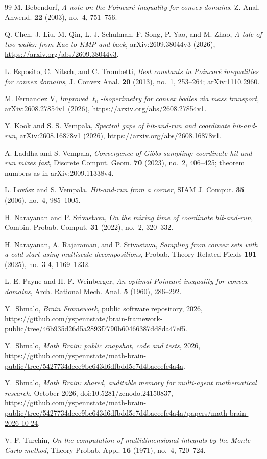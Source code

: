 \documentclass[11pt]{amsart}
\theoremstyle{remark}
\numberwithin{equation}{section}
\begin{document}
\begin{thebibliography}{99}
M. Bebendorf,
\emph{A note on the Poincar\'e inequality for convex domains},
Z. Anal. Anwend. \textbf{22} (2003), no.~4, 751--756.

Q. Chen, J. Liu, M. Qin, L. J. Schulman, F. Song, P. Yao, and M. Zhao,
\emph{A tale of two walks: from Kac to KMP and back},
arXiv:2609.38044v3 (2026),
\url{https://arxiv.org/abs/2609.38044v3}.

L. Esposito, C. Nitsch, and C. Trombetti,
\emph{Best constants in Poincar\'e inequalities for convex domains},
J. Convex Anal. \textbf{20} (2013), no.~1, 253--264;
arXiv:1110.2960.

M. Fernandez V,
\emph{Improved $\ell_0$-isoperimetry for convex bodies via mass transport},
arXiv:2608.27854v1 (2026),
\url{https://arxiv.org/abs/2608.27854v1}.

Y. Kook and S. S. Vempala,
\emph{Spectral gaps of hit-and-run and coordinate hit-and-run},
arXiv:2608.16878v1 (2026),
\url{https://arxiv.org/abs/2608.16878v1}.

A. Laddha and S. Vempala,
\emph{Convergence of Gibbs sampling: coordinate hit-and-run mixes fast},
Discrete Comput. Geom. \textbf{70} (2023), no.~2, 406--425;
theorem numbers as in arXiv:2009.11338v4.

L. Lov\'asz and S. Vempala,
\emph{Hit-and-run from a corner},
SIAM J. Comput. \textbf{35} (2006), no.~4, 985--1005.

H. Narayanan and P. Srivastava,
\emph{On the mixing time of coordinate hit-and-run},
Combin. Probab. Comput. \textbf{31} (2022), no.~2, 320--332.

H. Narayanan, A. Rajaraman, and P. Srivastava,
\emph{Sampling from convex sets with a cold start using multiscale decompositions},
Probab. Theory Related Fields \textbf{191} (2025), no.~3-4, 1169--1232.

L. E. Payne and H. F. Weinberger,
\emph{An optimal Poincar\'e inequality for convex domains},
Arch. Rational Mech. Anal. \textbf{5} (1960), 286--292.

 Y.~Shmalo, \emph{Brain Framework}, public software repository, 2026, \url{https://github.com/yspennstate/brain-framework-public/tree/46b935d26d5a2893f7790b60466387dd8da47ef5}.

 Y.~Shmalo, \emph{Math Brain: public snapshot, code and tests}, 2026, \url{https://github.com/yspennstate/math-brain-public/tree/5427734deee9be643d6dfbdd5e7d4baeeefe4a4a}.

 Y.~Shmalo, \emph{Math Brain: shared, auditable memory for multi-agent mathematical research}, October 2026, doi:10.5281/zenodo.24150837, \url{https://github.com/yspennstate/math-brain-public/tree/5427734deee9be643d6dfbdd5e7d4baeeefe4a4a/papers/math-brain-2026-10-24}.

V. F. Turchin,
\emph{On the computation of multidimensional integrals by the Monte-Carlo method},
Theory Probab. Appl. \textbf{16} (1971), no.~4, 720--724.

\end{thebibliography}
\end{document}
